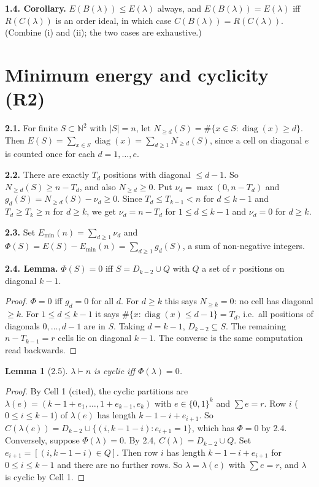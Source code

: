 \documentclass[11pt]{article}
\newtheorem{lemma}{Lemma}
\theoremstyle{remark}
\newcommand{\N}{\mathbb{N}}
\newcommand{\diag}{\operatorname{diag}}
\begin{document}
\textbf{1.4. Corollary.} $E(B(\lambda))\le E(\lambda)$ always, and $E(B(\lambda))=E(\lambda)$ iff $R(C(\lambda))$
is an order ideal, in which case $C(B(\lambda))=R(C(\lambda))$. (Combine (i) and (ii); the two cases are
exhaustive.)

\section{Minimum energy and cyclicity (R2)}

\textbf{2.1.} For finite $S\subset\N^2$ with $|S|=n$, let $N_{\ge d}(S)=\#\{x\in S:\diag(x)\ge d\}$. Then
$E(S)=\sum_{x\in S}\diag(x)=\sum_{d\ge1}N_{\ge d}(S)$, since a cell on diagonal $e$ is counted once for each
$d=1,\dots,e$.

\textbf{2.2.} There are exactly $T_d$ positions with diagonal $\le d-1$. So $N_{\ge d}(S)\ge n-T_d$, and also
$N_{\ge d}\ge0$. Put $\nu_d=\max(0,n-T_d)$ and $g_d(S)=N_{\ge d}(S)-\nu_d\ge 0$. Since $T_d\le T_{k-1}<n$ for
$d\le k-1$ and $T_d\ge T_k\ge n$ for $d\ge k$, we get $\nu_d=n-T_d$ for $1\le d\le k-1$ and $\nu_d=0$ for $d\ge k$.

\textbf{2.3.} Set $E_{\min}(n)=\sum_{d\ge1}\nu_d$ and $\Phi(S)=E(S)-E_{\min}(n)=\sum_{d\ge1}g_d(S)$, a sum of
non-negative integers.

\textbf{2.4. Lemma.} $\Phi(S)=0$ iff $S=D_{k-2}\cup Q$ with $Q$ a set of $r$ positions on diagonal $k-1$.

\begin{proof}
$\Phi=0$ iff $g_d=0$ for all $d$. For $d\ge k$ this says $N_{\ge k}=0$: no cell has diagonal $\ge k$. For
$1\le d\le k-1$ it says $\#\{x:\diag(x)\le d-1\}=T_d$, i.e.\ all positions of diagonals $0,\dots,d-1$ are in $S$.
Taking $d=k-1$, $D_{k-2}\subseteq S$. The remaining $n-T_{k-1}=r$ cells lie on diagonal $k-1$. The converse is the
same computation read backwards.
\end{proof}

\begin{lemma}[2.5]\label{lem:R2}
$\lambda\vdash n$ is cyclic iff $\Phi(\lambda)=0$.
\end{lemma}

\begin{proof}
By Cell 1 (cited), the cyclic partitions are $\lambda(e)=(k-1+e_1,\dots,1+e_{k-1},e_k)$ with $e\in\{0,1\}^k$ and
$\sum e=r$. Row $i$ ($0\le i\le k-1$) of $\lambda(e)$ has length $k-1-i+e_{i+1}$. So
$C(\lambda(e))=D_{k-2}\cup\{(i,k-1-i):e_{i+1}=1\}$, which has $\Phi=0$ by 2.4. Conversely, suppose
$\Phi(\lambda)=0$. By 2.4, $C(\lambda)=D_{k-2}\cup Q$. Set $e_{i+1}=[(i,k-1-i)\in Q]$. Then row $i$ has length
$k-1-i+e_{i+1}$ for $0\le i\le k-1$ and there are no further rows. So $\lambda=\lambda(e)$ with $\sum e=r$, and
$\lambda$ is cyclic by Cell 1.
\end{proof}
\end{document}
